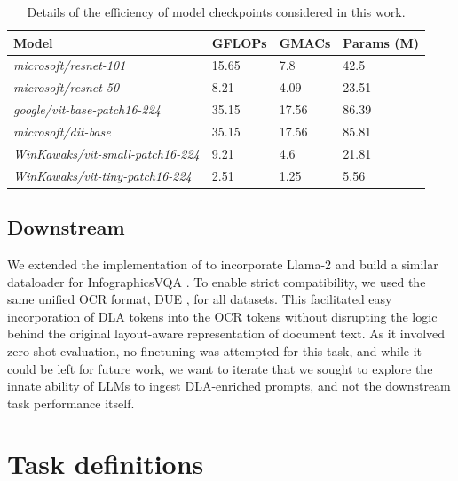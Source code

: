 \begin{table}[h]
\centering
  \caption{Details of the efficiency of model checkpoints considered in this work.}
  \label{tab:resnet}
\begin{tabular}{llll}
\hline
\textbf{Model}                  & \textbf{GFLOPs} & \textbf{GMACs} & \textbf{Params (M)} \\ \hline
\textit{microsoft/resnet-101  }          & 15.65           & 7.8            & 42.5               \\
\textit{microsoft/resnet-50  }           & 8.21            & 4.09           & 23.51              \\
\textit{google/vit-base-patch16-224}     & 35.15           & 17.56          & 86.39              \\
\textit{microsoft/dit-base }             & 35.15           & 17.56          & 85.81              \\
\textit{WinKawaks/vit-small-patch16-224} & 9.21            & 4.6            & 21.81              \\
\textit{WinKawaks/vit-tiny-patch16-224}  & 2.51            & 1.25           & 5.56            \\ \bottomrule
\end{tabular}
\end{table}



\subsection{Downstream}

We extended the implementation of \cite{wang2023layout} to incorporate Llama-2 \cite{touvron2023llama} and build a similar dataloader for InfographicsVQA \cite{mathew2022infographicvqa}.
To enable strict compatibility, we used the same unified OCR format, DUE \cite{borchmann2021due}, for all datasets. This facilitated easy incorporation of DLA tokens into the OCR tokens without disrupting the logic behind the original layout-aware representation of document text.
As it involved zero-shot evaluation, no finetuning was attempted for this task, and while it could be left for future work, we want to iterate that we sought to explore the innate ability of LLMs to ingest DLA-enriched prompts, and not the downstream task performance itself.


\section{Task definitions}\label{sec:supp-taskdef}

